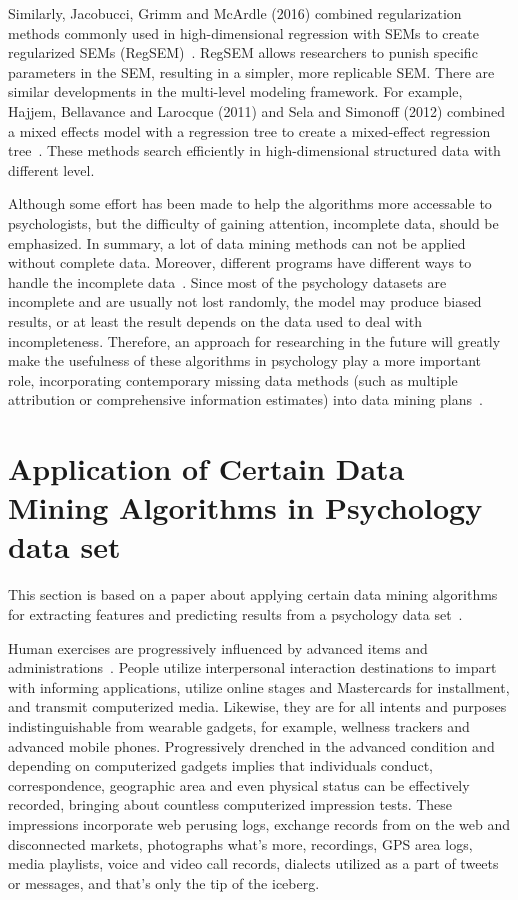 Similarly, Jacobucci, Grimm and McArdle (2016) combined 
regularization methods commonly used in high-dimensional regression
 with SEMs to create regularized SEMs (RegSEM)~\cite{hid515-11}. 
RegSEM allows 
researchers to punish specific parameters in the SEM, resulting in
 a simpler, more replicable SEM. There are similar developments in
 the multi-level modeling framework. For example, Hajjem, 
Bellavance and Larocque (2011) and Sela and Simonoff (2012) 
combined
 a mixed effects model with a regression tree to create a 
mixed-effect regression tree~\cite{hid515-11}. 
These methods search efficiently in
 high-dimensional structured data with different level.

Although some effort has been made to help the algorithms more 
accessable to psychologists, but the difficulty of gaining 
attention, incomplete data, should be emphasized. 
In summary, a lot of data mining methods can not be applied without
 complete data. Moreover, different programs have different ways to
 handle the incomplete data~\cite{hid515-11}. 
Since most of the psychology datasets are incomplete and are 
usually not lost randomly, 
the model may produce biased results, or at 
least the result depends on the data used to deal with 
incompleteness. Therefore, an approach for researching in the 
future will 
greatly make the usefulness of these algorithms in psychology play 
a more important role, incorporating contemporary missing data methods 
(such as
 multiple attribution or comprehensive information estimates) into
 data mining plans~\cite{hid515-11}.

\section{Application of Certain Data Mining 
Algorithms in Psychology data set}

This section is based on a paper about applying certain data mining
 algorithms for extracting features and predicting results from a 
psychology data set~\cite{hid515-12}.

Human exercises are progressively influenced by advanced items and 
administrations~\cite{hid515-13}.
People utilize interpersonal interaction destinations to impart 
with informing applications, utilize online stages and Mastercards 
for installment, and transmit computerized media. Likewise, they 
are for all intents and purposes indistinguishable from wearable 
gadgets, for example, wellness 
trackers and advanced mobile phones. Progressively drenched in the
 advanced 
condition and depending on computerized gadgets implies that 
individuals
conduct, correspondence, geographic area and even physical 
status can be effectively recorded, bringing about countless 
computerized impression tests. These impressions incorporate web 
perusing 
logs, exchange records from on the web and disconnected markets, 
photographs 
what's more, recordings, GPS area logs, media playlists, voice and
 video 
call records, dialects utilized as a part of tweets or messages, 
and that's only the tip of the iceberg.

